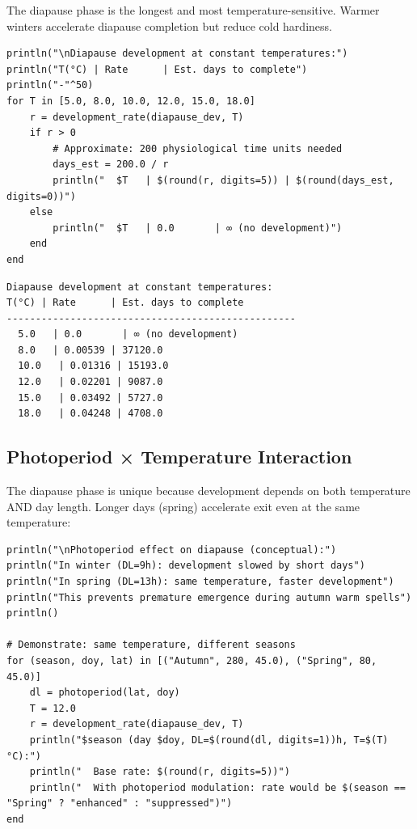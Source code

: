 \label{712206769335337344}{}


The diapause phase is the longest and most temperature-sensitive. Warmer winters accelerate diapause completion but reduce cold hardiness.




\begin{verbatim}
println("\nDiapause development at constant temperatures:")
println("T(°C) | Rate      | Est. days to complete")
println("-"^50)
for T in [5.0, 8.0, 10.0, 12.0, 15.0, 18.0]
    r = development_rate(diapause_dev, T)
    if r > 0
        # Approximate: 200 physiological time units needed
        days_est = 200.0 / r
        println("  $T   | $(round(r, digits=5)) | $(round(days_est, digits=0))")
    else
        println("  $T   | 0.0       | ∞ (no development)")
    end
end
\end{verbatim}




\begin{verbatim}
Diapause development at constant temperatures:
T(°C) | Rate      | Est. days to complete
--------------------------------------------------
  5.0   | 0.0       | ∞ (no development)
  8.0   | 0.00539 | 37120.0
  10.0   | 0.01316 | 15193.0
  12.0   | 0.02201 | 9087.0
  15.0   | 0.03492 | 5727.0
  18.0   | 0.04248 | 4708.0
\end{verbatim}



\subsection{Photoperiod × Temperature Interaction}



\label{15035815857639120778}{}


The diapause phase is unique because development depends on both temperature AND day length. Longer days (spring) accelerate exit even at the same temperature:




\begin{verbatim}
println("\nPhotoperiod effect on diapause (conceptual):")
println("In winter (DL=9h): development slowed by short days")
println("In spring (DL=13h): same temperature, faster development")
println("This prevents premature emergence during autumn warm spells")
println()

# Demonstrate: same temperature, different seasons
for (season, doy, lat) in [("Autumn", 280, 45.0), ("Spring", 80, 45.0)]
    dl = photoperiod(lat, doy)
    T = 12.0
    r = development_rate(diapause_dev, T)
    println("$season (day $doy, DL=$(round(dl, digits=1))h, T=$(T)°C):")
    println("  Base rate: $(round(r, digits=5))")
    println("  With photoperiod modulation: rate would be $(season == "Spring" ? "enhanced" : "suppressed")")
end
\end{verbatim}




